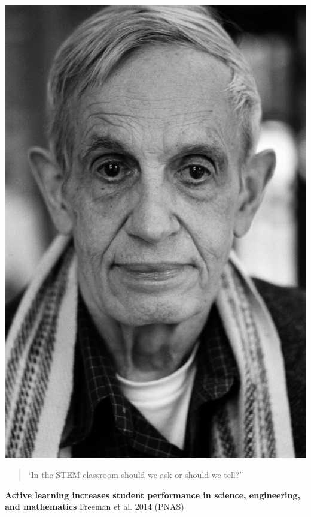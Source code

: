\documentclass{beamer}
\begin{document}
    \begin{frame}
        \begin{center}
            \includegraphics[width=.5\textwidth]{static/nash.jpg}
        \end{center}
    \end{frame}

    \begin{frame}
        \small
        \begin{quote}
            `In the STEM classroom should we ask or should we tell?''
        \end{quote}

        \begin{center}
            \textbf{Active learning increases student performance in
            science, engineering, and mathematics} Freeman et al. 2014 (PNAS)
        \end{center}
    \end{frame}
\end{document}
